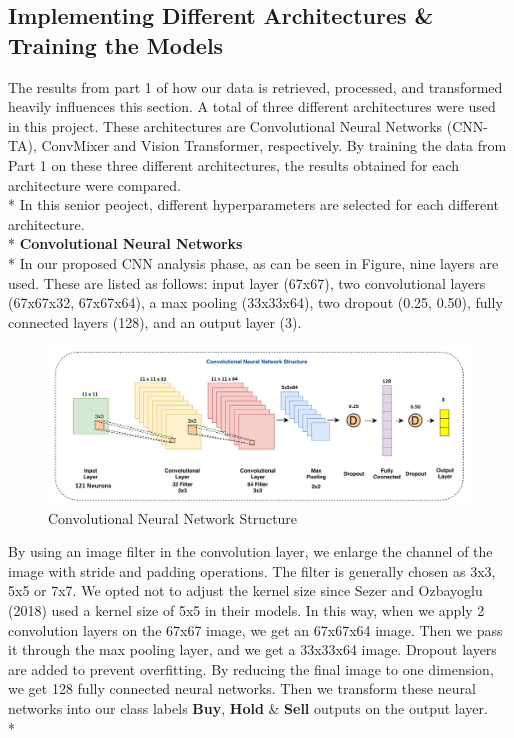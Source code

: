 \documentclass[]{article}
\begin{document}
\subsection{Implementing Different Architectures \& Training the Models}
The results from part 1 of how our data is retrieved, processed, and transformed heavily influences this section. A total of three different architectures were used in this project. These architectures are Convolutional Neural Networks (CNN-TA), ConvMixer and Vision Transformer, respectively. By training the data from Part 1 on these three different architectures, the results obtained for each architecture were compared.\vspace{0.1cm} \\*
In this senior peoject, different hyperparameters are selected for each different architecture.\vspace{0.3cm} \\*
\textbf{\large Convolutional Neural Networks} \\*
In our proposed CNN analysis phase, as can be seen in Figure, nine layers are used. These are listed as follows: input layer (67x67), two convolutional layers (67x67x32, 67x67x64), a max pooling (33x33x64), two dropout (0.25, 0.50), fully connected layers (128), and an output layer (3).
\begin{figure}[H]
\begin{center}
   \includegraphics[scale=0.24]{assets/structures/cnn.png}
   \caption{Convolutional Neural Network Structure}
\end{center}
\end{figure}
\noindent
By using an image filter in the convolution layer, we enlarge the channel of the image with stride and padding operations. The filter is generally chosen as 3x3, 5x5 or 7x7. We opted not to adjust the kernel size since Sezer and Ozbayoglu (2018) used a kernel size of 5x5 in their models. In this way, when we apply 2 convolution layers on the 67x67 image, we get an 67x67x64 image. Then we pass it through the max pooling layer, and we get a 33x33x64 image. \newline Dropout layers are added to prevent overfitting. By reducing the final image to one dimension, we get 128 fully connected neural networks. Then we transform these neural networks into our class labels \textbf{Buy}, \textbf{Hold} \& \textbf{Sell} outputs on the output layer.\vspace{0.1cm} \\*
\end{document}
